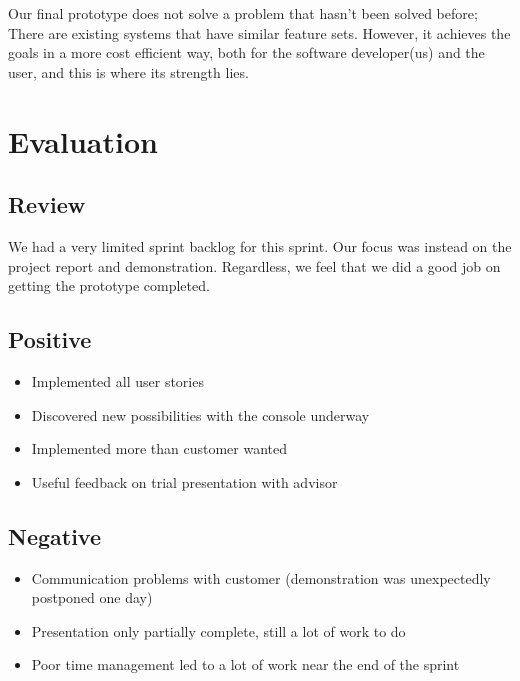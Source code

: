 Our final prototype does not solve a problem that hasn't been solved before; There are existing systems that have similar feature sets. However, it achieves the goals in a more cost efficient way, both for the software developer(us) and the user, and this is where its strength lies.

\section{Evaluation}
\subsection{Review}
We had a very limited sprint backlog for this sprint. Our focus was instead on the project report and demonstration. Regardless, we feel that we did a good job on getting the prototype completed. 
\subsection{Positive}
\begin{itemize}
 \item Implemented all user stories
 \item Discovered new possibilities with the console underway
 \item Implemented more than customer wanted
 \item Useful feedback on trial presentation with advisor
\end{itemize}
\subsection{Negative}
\begin{itemize}
 \item Communication problems with customer (demonstration was unexpectedly postponed one day)
 \item Presentation only partially complete, still a lot of work to do
 \item Poor time management led to a lot of work near the end of the sprint
\end{itemize}